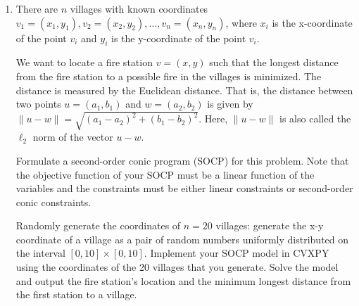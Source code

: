 \documentclass[11pt]{article}
\begin{document}
\begin{enumerate}
(c) Recall $A\preceq_{\mathbb{S}^3_+}B$ iff $B-A\succeq 0$, and $A\succeq_{\mathbb{S}^3_+}C$ iff $A-C\succeq 0$.

For $B-A$:
\[
    B-A=\begin{bmatrix}
        6 & -6 & -6\\
        -6 & 10 & -6\\
        -6 & -6 & 14
    \end{bmatrix}.
\]
Its characteristic polynomial is
\[
    \chi_{B-A}(\lambda)=\lambda^3-30\lambda^2+176\lambda+672=(\lambda-14)\bigl(\lambda^2-16\lambda-48\bigr),
\]
giving eigenvalues $\{14,\;8+4\sqrt{7},\;8-4\sqrt{7}\}$. Since $8-4\sqrt{7}\approx-2.583<0$, $B-A$ is not PSD, so $A\preceq_{\mathbb{S}^3_+}B$ is \textbf{false}.

For $A-C$:
\[
    A-C=\begin{bmatrix}
        4 & -2 & 0\\
        -2 & 0 & 2\\
        0 & 2 & 2
    \end{bmatrix}.
\]
Its characteristic polynomial is $\chi_{A-C}(\lambda)=\lambda^3-6\lambda^2+24$, whose eigenvalues are approximately
\[
    \{-1.759,\;2.695,\;5.064\}.
\]
Because one eigenvalue is negative, $A-C$ is not PSD, so $A\succeq_{\mathbb{S}^3_+}C$ is \textbf{false}.


    \item There are $n$ villages with known coordinates $v_1=(x_1,y_1), v_2=(x_2,y_2), \dots, v_n=(x_n,y_n)$, where $x_i$ is the x-coordinate of the point $v_i$ and $y_i$ is the y-coordinate of the point $v_i$.
    
    We want to locate a fire station $v=(x,y)$ such that the longest distance from the fire station to a possible fire in the villages is minimized. The distance is measured by the Euclidean distance. That is, the distance between two points $u=(a_1,b_1)$ and $w=(a_2,b_2)$ is given by $\|u-w\|=\sqrt{(a_1-a_2)^2+(b_1-b_2)^2}$. Here, $\|u-w\|$ is also called the $\ell_2$ norm of the vector $u-w$.
    
    Formulate a second-order conic program (SOCP) for this problem. Note that the objective function of your SOCP must be a linear function of the variables and the constraints must be either linear constraints or second-order conic constraints.
    
    Randomly generate the coordinates of $n=20$ villages: generate the x-y coordinate of a village as a pair of random numbers uniformly distributed on the interval $[0,10]\times[0,10]$. Implement your SOCP model in CVXPY using the coordinates of the 20 villages that you generate. Solve the model and output the fire station's location and the minimum longest distance from the first station to a village.
    




\end{enumerate}
\end{document}
